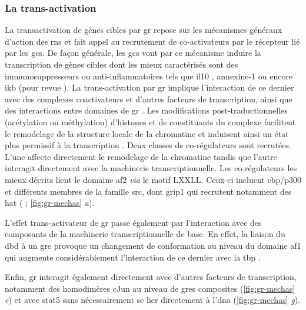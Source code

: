 \documentclass[../main.tex]{subfiles}
\begin{document}
		\subsubsection{La trans-activation}
			La transactivation de gènes cibles par \gls{gr} repose sur les mécanismes généraux d'action des \glspl{rn} et fait appel au recrutement de co-activateurs par le récepteur lié par les \glspl{gc}.
			De façon générale, les \glspl{gc} vont par ce mécanisme induire la transcription de gènes cibles dont les mieux caractérisés sont des immunosuppresseurs ou anti-inflammatoires tels que \gls{il10} \citep{Mozo2004}, annexine-1 \citep{Philip1997} ou encore \gls{ikb} \citep{Auphan1995} (pour revue \citealp{Newton2000}).
			La trans-activation par \gls{gr} implique l'interaction de ce dernier avec des complexes coactivateurs et d'autres facteurs de transcription, ainsi que des interactions entre domaines de \gls{gr} \citep{Bledsoe2002,Kumar2005}.
			Les modifications post-traductionnelles (acétylation ou méthylation) d'histones et de constituants du complexe facilitent le remodelage de la structure locale de la chromatine et induisent ainsi un état plus permissif à la transcription \citep{Aranda2001}.
			Deux classes de co-régulateurs sont recrutées.
			L'une affecte directement le remodelage de la chromatine tandis que l'autre interagit directement avec la machinerie transcriptionnelle.
			Les co-régulateurs les mieux décrits lient le domaine \gls{af2} \textit{via} le motif LXXLL.
			Ceux-ci incluent \gls{cbp}/p300 et différents membres de la famille \gls{src}, dont \gls{grip1} qui recrutent notamment des \gls{hat} (\citep{Fryer1998} ; \autoref{fig:gr-mechas} \textit{a}).

			

			L'effet trans-activateur de \gls{gr} passe également par l'interaction avec des composants de la machinerie transcriptionnelle de base.
			En effet, la liaison du \gls{dbd} à un \gls{gre} provoque un changement de conformation au niveau du domaine \gls{af1} qui augmente considérablement l'interaction de ce dernier avec la \gls{tbp} \citep{Kumar2004}.
			\par
			Enfin, \gls{gr} interagit également directement avec d'autres facteurs de transcription, notamment des homodimères cJun au niveau de \glspl{gre} composites (\autoref{fig:gr-mechas} \textit{e}) et avec \gls{stat5} \citep{Stoecklin1997} sans nécessairement se lier directement à l'\gls{dna} (\autoref{fig:gr-mechas} \textit{g}).
\end{document}
